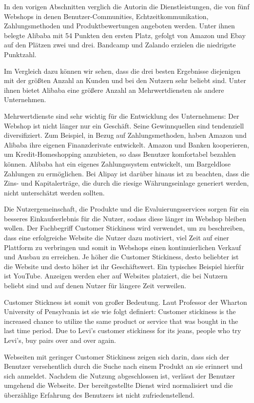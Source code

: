 In den vorigen Abschnitten verglich die Autorin die Dienstleistungen, die von fünf Webshops in denen Benutzer-Communities, Echtzeitkommunikation, Zahlungsmethoden und Produktbewertungen angeboten werden. Unter ihnen belegte Alibaba mit 54 Punkten den ersten Platz, gefolgt von Amazon und Ebay auf den Plätzen zwei und drei. Bandcamp und Zalando erzielen die niedrigste Punktzahl.

Im Vergleich dazu können wir sehen, dass die drei besten Ergebnisse diejenigen mit der größten Anzahl an Kunden und bei den Nutzern sehr beliebt sind. Unter ihnen bietet Alibaba eine größere Anzahl an Mehrwertdiensten als andere Unternehmen.

Mehrwertdienste sind sehr wichtig für die Entwicklung des Unternehmens: Der Webshop ist nicht länger nur ein Geschäft. Seine Gewinnquellen sind tendenziell diversifiziert. Zum Beispiel, in Bezug auf Zahlungsmethoden, haben Amazon und Alibaba ihre eigenen Finanzderivate entwickelt. Amazon und Banken kooperieren, um Kredit-Homeshopping anzubieten, so dass Benutzer komfortabel bezahlen können. Alibaba hat ein eigenes Zahlungssystem entwickelt, um \glqq{}Bargeldlose\grqq{} Zahlungen zu ermöglichen. Bei Alipay ist darüber hinaus ist zu beachten, dass die Zins- und Kapitalerträge, die durch die riesige Währungseinlage generiert werden, nicht unterschätzt werden sollten.

Die Nutzergemeinschaft, die Produkte und die Evaluierungsservices sorgen für ein besseres Einkaufserlebnis für die Nutzer, sodass diese länger im Webshop bleiben wollen. Der Fachbegriff Customer Stickiness wird verwendet, um zu beschreiben, dass eine erfolgreiche Website die Nutzer dazu motiviert, viel Zeit auf einer Plattform zu verbringen und somit in Webshops einen kontinuierlichen Verkauf und Ausbau zu erreichen. Je höher die Customer Stickiness, desto beliebter ist die Website und desto höher ist ihr Geschäftswert. Ein typisches Beispiel hierfür ist YouTube. Anzeigen werden eher auf Websites platziert, die bei Nutzern beliebt sind und auf denen Nutzer für längere Zeit verweilen.

Customer Stickness ist somit von großer Bedeutung. Laut \textcite{bradlow-wharton} Professor der Wharton University of Pensylvania ist sie wie folgt definiert: \glqq{}Customer stickiness is the increased chance to utilize the same product or service that was bought in the last time period. Due to Levi’s customer stickiness for its jeans, people who try Levi’s, buy pairs over and over again.\grqq{}

Webseiten mit geringer Customer Stickiness zeigen sich darin, dass sich der Benutzer versehentlich durch die Suche nach einem Produkt an sie erinnert und sich anmeldet. Nachdem die Nutzung abgeschlossen ist, verlässt der Benutzer umgehend die Webseite. Der bereitgestellte Dienst wird normalisiert und die \glqq{}überzählige\grqq{} Erfahrung des Benutzers ist nicht zufriedenstellend.\\
\parencite{localytics}

